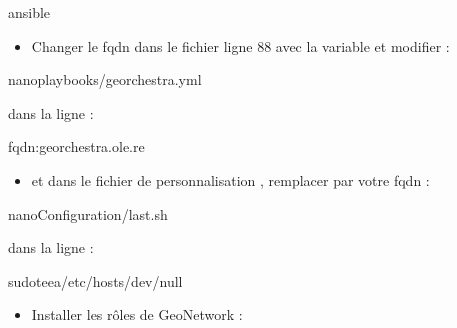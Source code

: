\documentclass[letterpaper,10pt,french]{sphinxmanual}
\begin{document}
\begin{sphinxVerbatim}[commandchars=\\\{\}]
ansible
\end{sphinxVerbatim}
\begin{itemize}
\item {} 
\sphinxAtStartPar
Changer le fqdn dans le fichier  ligne 88 avec la variable  et modifier  :

\end{itemize}

\begin{sphinxVerbatim}[commandchars=\\\{\}]
nanoplaybooks/georchestra.yml
\end{sphinxVerbatim}

\sphinxAtStartPar
dans la ligne :

\begin{sphinxVerbatim}[commandchars=\\\{\}]
fqdn:georchestra.ole.re
\end{sphinxVerbatim}
\begin{itemize}
\item {} 
\sphinxAtStartPar
et dans le fichier de personnalisation , remplacer  par votre fqdn :

\end{itemize}

\begin{sphinxVerbatim}[commandchars=\\\{\}]
nanoConfiguration/last.sh
\end{sphinxVerbatim}

\sphinxAtStartPar
dans la ligne :

\begin{sphinxVerbatim}[commandchars=\\\{\}]
sudotee\PYGZhy{}a/etc/hosts\PYGZgt{}/dev/null
\end{sphinxVerbatim}
\begin{itemize}
\item {} 
\sphinxAtStartPar
Installer les rôles de GeoNetwork :

\end{itemize}
\end{document}
